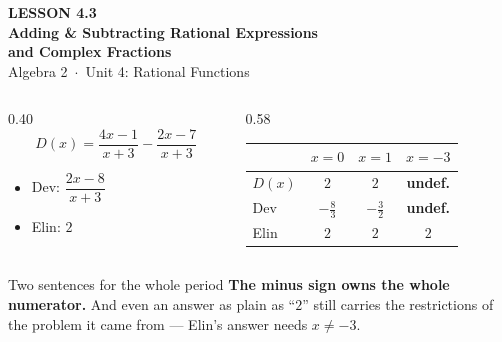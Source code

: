 \documentclass[aspectratio=169, 11pt]{beamer}
\begin{document}
{
\begin{frame}[plain]
  \vspace{2.8cm}\hspace{0.55cm}%
  \begin{minipage}{0.9\textwidth}
    {\color{goldacc}\bfseries\small LESSON 4.3}\\[0.5cm]
    {\color{white}\bfseries\LARGE Adding \& Subtracting Rational Expressions}\\[0.35cm]
    {\color{white}\bfseries\large and Complex Fractions}\\[1.0cm]
    {\color{forestmid}\small Algebra 2~$\cdot$~Unit 4: Rational Functions}
  \end{minipage}
\end{frame}
}

\begin{frame}[t, plain]
  \begin{columns}[T]
    \begin{column}{0.40\textwidth}
      \[ D(x)=\frac{4x-1}{x+3}-\frac{2x-7}{x+3} \]
      \vspace{-8pt}
      \begin{itemize}\setlength{\itemsep}{4pt}
        \item Dev: $\dfrac{2x-8}{x+3}$
        \item Elin: $2$
      \end{itemize}
    \end{column}
    \begin{column}{0.58\textwidth}
      \centering
      \renewcommand{\arraystretch}{1.4}
      \begin{tabular}{|l|c|c|c|}
      \hline
       & $x=0$ & $x=1$ & $x=-3$ \\ \hline
      $D(x)$ & $2$ & $2$ & \textbf{undef.} \\ \hline
      Dev    & $-\frac83$ & $-\frac32$ & \textbf{undef.} \\ \hline
      Elin   & $2$ & $2$ & $2$ \\ \hline
      \end{tabular}
    \end{column}
  \end{columns}
  \vspace{6pt}
  \begin{block}{Two sentences for the whole period}
    \textbf{The minus sign owns the whole numerator.} And even an answer as plain as ``$2$'' still
    carries the restrictions of the problem it came from --- Elin's answer needs $x\neq-3$.
  \end{block}
\end{frame}
\end{document}
